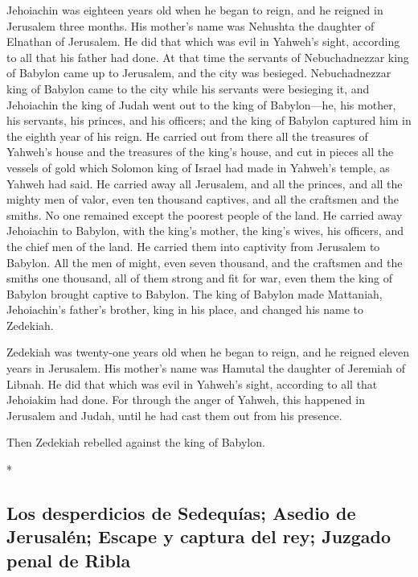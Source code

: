 \begin{paracol}{2}
\begin{otherlanguage}{english}
 Jehoiachin was eighteen years old when he began to reign,
and he reigned in Jerusalem three months. His mother's name was Nehushta
the daughter of Elnathan of Jerusalem.  He did that which
was evil in Yahweh's sight, according to all that his father had done.
 At that time the servants of Nebuchadnezzar king of
Babylon came up to Jerusalem, and the city was besieged. 
Nebuchadnezzar king of Babylon came to the city while his servants were
besieging it,  and Jehoiachin the king of Judah went out
to the king of Babylon---he, his mother, his servants, his princes, and
his officers; and the king of Babylon captured him in the eighth year of
his reign.  He carried out from there all the treasures
of Yahweh's house and the treasures of the king's house, and cut in
pieces all the vessels of gold which Solomon king of Israel had made in
Yahweh's temple, as Yahweh had said.  He carried away all
Jerusalem, and all the princes, and all the mighty men of valor, even
ten thousand captives, and all the craftsmen and the smiths. No one
remained except the poorest people of the land.  He
carried away Jehoiachin to Babylon, with the king's mother, the king's
wives, his officers, and the chief men of the land. He carried them into
captivity from Jerusalem to Babylon.  All the men of
might, even seven thousand, and the craftsmen and the smiths one
thousand, all of them strong and fit for war, even them the king of
Babylon brought captive to Babylon.  The king of Babylon
made Mattaniah, Jehoiachin's father's brother, king in his place, and
changed his name to Zedekiah.

 Zedekiah was twenty-one years old when he began to
reign, and he reigned eleven years in Jerusalem. His mother's name was
Hamutal the daughter of Jeremiah of Libnah.  He did that
which was evil in Yahweh's sight, according to all that Jehoiakim had
done.  For through the anger of Yahweh, this happened in
Jerusalem and Judah, until he had cast them out from his presence.

Then Zedekiah rebelled against the king of Babylon.

\end{otherlanguage}

\switchcolumn[0]*

\hypertarget{los-desperdicios-de-sedequuxedas-asedio-de-jerusaluxe9n-escape-y-captura-del-rey-juzgado-penal-de-ribla}{%
\subsection{Los desperdicios de Sedequías; Asedio de Jerusalén; Escape y
captura del rey; Juzgado penal de
Ribla}\label{los-desperdicios-de-sedequuxedas-asedio-de-jerusaluxe9n-escape-y-captura-del-rey-juzgado-penal-de-ribla}}


\end{paracol}
